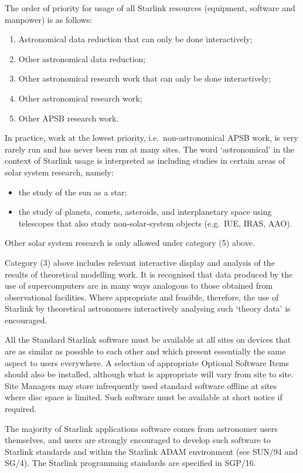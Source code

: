 The order of priority for usage of all Starlink resources (equipment, software
and manpower) is as follows:
\begin{enumerate}
\item Astronomical data reduction that can only be done interactively;
\item Other astronomical data reduction;
\item Other astronomical research work that can only be done interactively;
\item Other astronomical research work;
\item Other APSB research work.
\end{enumerate}
In practice, work at the lowest priority, i.e.\ non-astronomical APSB work, is
very rarely run and has never been run at many sites.
The word `astronomical' in the context of Starlink usage is interpreted as
including studies in certain areas of solar system research, namely:
\begin{itemize}
\item the study of the sun as a star;
\item the study of planets, comets, asteroids, and interplanetary space using
telescopes that also study non-solar-system objects (e.g.\ IUE, IRAS, AAO).
\end{itemize}
Other solar system research is only allowed under category (5) above.

Category (3) above includes relevant interactive display and analysis of the
results of theoretical modelling work.
It is recognised that data produced by the use of supercomputers are in many
ways analogous to those obtained from observational facilities.
Where appropriate and feasible, therefore, the use of Starlink by theoretical
astronomers interactively analysing such `theory data' is encouraged.

All the Standard Starlink software must be available at all sites on devices
that are as similar as possible to each other and which present essentially the
same aspect to users everywhere.
A selection of appropriate Optional Software Items should also be installed, 
although what is appropriate will vary from site to site.
Site Managers may store infrequently used standard software offline at sites
where disc space is limited.
Such software must be available at short notice if required.

The majority of Starlink applications software comes from astronomer users
themselves, and users are strongly encouraged to develop such software to
Starlink standards and within the Starlink ADAM environment (see SUN/94 and
SG/4).
The Starlink programming standards are specified in SGP/16.

